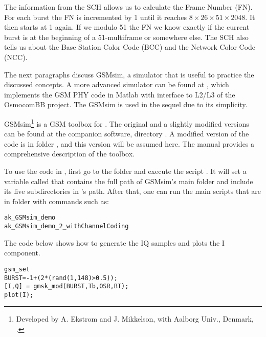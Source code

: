 The information from the SCH allows us to calculate the Frame Number (FN). For each
burst the FN is incremented by 1 until it reaches $8 \times 26 \times 51 \times 2048$. It then starts at 1
again. If we modulo 51 the FN we know exactly if the current burst is at the beginning of
a 51-multiframe or somewhere else. The SCH also tells us about the Base Station Color
Code (BCC) and the Network Color Code (NCC).

The next paragraphs discuss GSMsim, a simulator that is useful to practice the discussed concepts.
A more advanced simulator can be found at , which implements the GSM PHY code in Matlab with interface to L2/L3 of the OsmocomBB project. The GSMsim
is used in the sequel due to its simplicity.



GSMsim\footnote{Developed by A. Ekstrom and J. Mikkelson, with Aalborg Univ., Denmark, .} is a GSM toolbox for {\matlab}. The original and a slightly modified versions can be found at the companion software, directory . A modified version of the code is in folder , and this version will be assumed here. The manual  provides a comprehensive description of the toolbox.

To use the code in {\matlab}, first go to the folder  and execute the script . It will set a variable called  that contains the full path of GSMsim's main folder and include its five subdirectories in {\matlab}'s path. After that, one can run the main scripts that are in folder  with commands such as:
\begin{lstlisting}
ak_GSMsim_demo
ak_GSMsim_demo_2_withChannelCoding
\end{lstlisting}

The code below shows how to generate the IQ samples and plots the I component.
\begin{lstlisting}
gsm_set
BURST=-1+(2*(rand(1,148)>0.5));
[I,Q] = gmsk_mod(BURST,Tb,OSR,BT);
plot(I);
\end{lstlisting}


